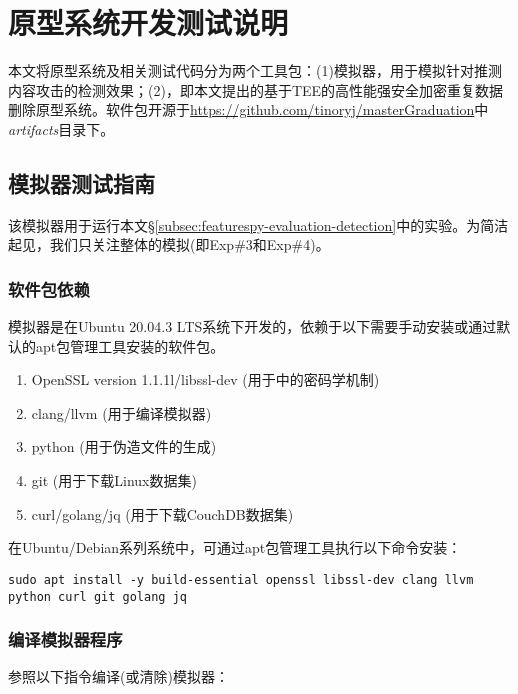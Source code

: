 \chapter{原型系统开发测试说明}
\label{chapter:appendix}

本文将原型系统及相关测试代码分为两个工具包：(1)\sysnameF 模拟器，用于模拟针对推测内容攻击的检测效果；(2)\prototype ，即本文提出的基于TEE的高性能强安全加密重复数据删除原型系统。软件包开源于\url{https://github.com/tinoryj/masterGraduation}中{\em artifacts}目录下。



\section{\sysnameF 模拟器测试指南}
该模拟器用于运行本文\S\ref{subsec:featurespy-evaluation-detection}中的实验。为简洁起见，我们只关注整体\sysnameF 的模拟(即Exp\#3和Exp\#4)。

\subsection*{软件包依赖}

\sysnameF 模拟器是在Ubuntu 20.04.3 LTS系统下开发的，依赖于以下需要手动安装或通过默认的apt包管理工具安装的软件包。

\begin{enumerate}[leftmargin=0em]
  \item OpenSSL version 1.1.1l/libssl-dev (用于\sysnameF 中的密码学机制)
  \item clang/llvm (用于编译模拟器)
  \item python (用于伪造文件的生成)
  \item git (用于下载Linux数据集)
  \item curl/golang/jq (用于下载CouchDB数据集)
\end{enumerate}

在Ubuntu/Debian系列系统中，可通过apt包管理工具执行以下命令安装：

\begin{lstlisting}[style=shell]
sudo apt install -y build-essential openssl libssl-dev clang llvm python curl git golang jq
\end{lstlisting}

\subsection*{编译模拟器程序}

参照以下指令编译(或清除)\sysnameF 模拟器：

